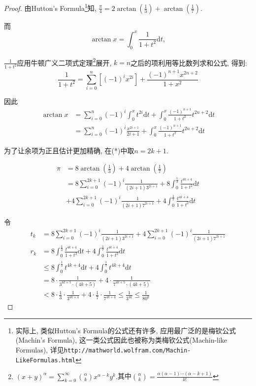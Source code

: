 \begin{proof}
    由Hutton's Formula\footnote{实际上, 类似Hutton's Formula的公式还有许多, 应用最广泛的是梅钦公式(Machin's Formula), 这一类公式因此也被称为类梅钦公式(Machin-like Formulas), 详见\texttt{http://mathworld.wolfram.com/Machin-LikeFormulas.html}}知, $\frac{\pi}{4}=2\arctan(\frac13)+\arctan(\frac17)$.

    而$$\arctan x=\int_0^x\frac{1}{1+t^2}\mathrm{d}t,$$

    $\frac{1}{1+t^2}$应用牛顿广义二项式定理\footnote{$(x+y)^{\alpha }=\sum _{{k=0}}^{\infty }\binom{\alpha}{k}x^{{\alpha -k}}y^{k}. $其中$\binom{\alpha}{k}=\frac{\alpha(\alpha-1)\cdots(\alpha-k+1)}{k!}$}展开, $k=n$之后的项利用等比数列求和公式, 得到: $$\frac{1}{1+t^2}=\sum_{i=0}^n[(-1)^ix^{2i}]+\frac{(-1)^{n+1}x^{2n+2}}{1+x^2}$$

    因此\begin{align*}
    \arctan x &=\sum_{i=0}^n (-1)^i \int_0^xt^{2i}\mathrm{d}t+\int_0^x\frac{(-1)^{n+1}}{1+t^2}t^{2n+2}\mathrm{d}t\\
    &=\sum_{i=0}^n(-1)^i\frac{x^{2i+1}}{2i+1}+\int_0^x\frac{(-1)^{n+1}}{1+t^2}t^{2n+2}\mathrm{d}t\tag{*}
    \end{align*}

    为了让余项为正且估计更加精确, 在(*)中取$n=2k+1$.

    \begin{align*}
        \pi &= 8\arctan(\frac{1}{3})+4\arctan(\frac{1}{7})\\
        &=8\sum_{i=0}^{2k+1}(-1)^i\frac{1}{(2i+1)3^{2i+1}}+8\int_0^{\frac{1}{3}}\frac{t^{4k+4}}{1+t^2}\mathrm{d}t\\
        &+4\sum_{i=0}^{2k+1}(-1)^i\frac{1}{(2i+1)7^{2i+1}}+4\int_0^{\frac{1}{7}}\frac{t^{4k+4}}{1+t^2}\mathrm{d}t
    \end{align*}

    令
    \begin{align*}
        t_k &=8\sum_{i=0}^{2k+1}(-1)^i\frac{1}{(2i+1)3^{2i+1}}+4\sum_{i=0}^{2k+1}(-1)^i\frac{1}{(2i+1)7^{2i+1}}\\
        r_k &=8\int_0^{\frac{1}{3}}\frac{t^{4k+4}}{1+t^2}\mathrm{d}t+4\int_0^{\frac{1}{7}}\frac{t^{4k+4}}{1+t^2}\mathrm{d}t\\
        &\leqslant8\int_0^{\frac{1}{3}}t^{4k+4}\mathrm{d}t+4\int_0^{\frac{1}{7}}t^{4k+4}\mathrm{d}t\\
        &=8\cdot \frac{1}{3^{4k+5}\cdot (4k+5)}+4\cdot\frac{1}{7^{4k+5}\cdot(4k+5)}\\
        &< 8\cdot\frac13\cdot\frac{1}{3^{4k+4}}+4\cdot\frac17\cdot\frac{1}{7^{4k+4}}\leqslant \frac{1}{3^{4k}}\leqslant \frac{1}{80^k}
    \end{align*}


\end{proof}
